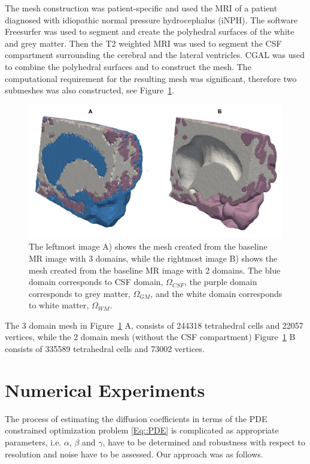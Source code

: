 \documentclass[12pt,a4paper]{article}
\begin{document}
The mesh construction was patient-specific and used the MRI of a patient diagnosed with idiopathic normal pressure hydrocephalus (iNPH). The software Freesurfer was used to segment and create the polyhedral surfaces of the white and grey matter. Then the T2 weighted MRI \cite{ringstad2018brain} was used to segment the CSF compartment surrounding the cerebral and the lateral ventricles. CGAL \cite{cgal:rty-m3-18b} was used to combine the polyhedral surfaces and to construct the mesh. The computational requirement for the resulting mesh was significant, therefore two submeshes was also constructed, see Figure~\ref{Fig::Mesh}.
\begin{figure}
\centering
\includegraphics[scale=0.2]{../mesh.png} 
\caption{The leftmost image A) shows the mesh created from the baseline MR image with 3 domains, while the rightmost image  B) shows the mesh created from the baseline MR image with 2 domains. The blue domain corresponds to CSF domain, $\Omega_{CSF}$, the purple domain corresponds to grey matter,  $\Omega_{GM}$, and the white domain corresponds to white matter, $\Omega_{WM}$. }
\label{Fig::Mesh}
\end{figure}
The 3 domain mesh in Figure~\ref{Fig::Mesh} A, consists of 244318 tetrahedral cells and 22057 vertices, while the 2 domain mesh (without the CSF compartment) Figure~\ref{Fig::Mesh} B consists of 335589 tetrahedral cells and 73002 vertices. 

\section{Numerical Experiments}

The process of estimating the diffusion coefficients in terms of  the PDE constrained optimization problem \eqref{Eq::PDE} is complicated as appropriate parameters, i.e. $\alpha$, $\beta$ and $\gamma$,  have 
to be determined and robustness with respect to resolution and noise have to be assessed. Our approach was as follows. 
\end{document}
